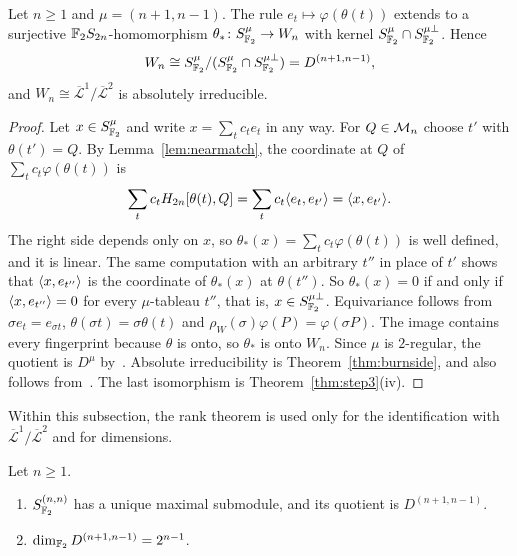 \begin{theorem}\label{thm:step4}
Let $n\ge1$ and $\mu=(n+1,n-1)$. The rule $e_t\mapsto\varphi(\theta(t))$ extends to a surjective $\mathbb{F}_2 S_{2n}$-homomorphism $\theta_*\colon S^\mu_{\mathbb{F}_2}\to W_n$ with kernel $S^\mu_{\mathbb{F}_2}\cap S^{\mu\perp}_{\mathbb{F}_2}$. Hence
\[
W_n\cong S^\mu_{\mathbb{F}_2}/(S^\mu_{\mathbb{F}_2}\cap S^{\mu\perp}_{\mathbb{F}_2})=D^{(n+1,n-1)},
\]
and $W_n\cong\overline{\mathcal L}^1/\overline{\mathcal L}^2$ is absolutely irreducible.
\end{theorem}

\begin{proof}
Let $x\in S^\mu_{\mathbb{F}_2}$ and write $x=\sum_{t}c_{t}e_t$ in any way. For $Q\in\mathcal{M}_n$ choose $t'$ with $\theta(t')=Q$. By Lemma~\ref{lem:nearmatch}, the coordinate at $Q$ of $\sum_{t}c_t\varphi(\theta(t))$ is
\[
\sum_{t}c_{t}H_{2n}[\theta(t),Q]=\sum_{t}c_t\langle e_t,e_{t'}\rangle=\langle x,e_{t'}\rangle .
\]
The right side depends only on $x$, so $\theta_*(x)=\sum_{t}c_t\varphi(\theta(t))$ is well defined, and it is linear. The same computation with an arbitrary $t''$ in place of $t'$ shows that $\langle x,e_{t''}\rangle$ is the coordinate of $\theta_*(x)$ at $\theta(t'')$. So $\theta_*(x)=0$ if and only if $\langle x,e_{t''}\rangle=0$ for every $\mu$-tableau $t''$, that is, $x\in S^{\mu\perp}_{\mathbb{F}_2}$. Equivariance follows from $\sigma e_t=e_{\sigma t}$, $\theta(\sigma t)=\sigma\theta(t)$ and $\rho_W(\sigma)\varphi(P)=\varphi(\sigma P)$. The image contains every fingerprint because $\theta$ is onto, so $\theta_*$ is onto $W_n$. Since $\mu$ is $2$-regular, the quotient is $D^\mu$ by~\cite[Def.~11.2]{James78}. Absolute irreducibility is Theorem~\ref{thm:burnside}, and also follows from~\cite[Thm.~4.9]{James78}. The last isomorphism is Theorem~\ref{thm:step3}(iv).
\end{proof}

Within this subsection, the rank theorem is used only for the identification with $\overline{\mathcal L}^1/\overline{\mathcal L}^2$ and for dimensions.

\begin{corollary}\label{cor:benson}
Let $n\ge1$.
\begin{enumerate}
\item $S^{(n,n)}_{\mathbb{F}_2}$ has a unique maximal submodule, and its quotient is $D^{(n+1,n-1)}$.
\item $\dim_{\mathbb{F}_2}D^{(n+1,n-1)}=2^{n-1}$.
\end{enumerate}
\end{corollary}

